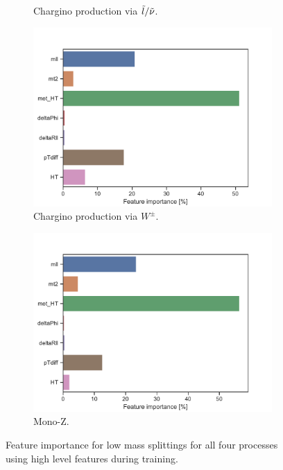 \begin{figure}[H]
\begin{subfigure}[t!]{0.49\textwidth}
        \caption{Chargino production via $\Tilde{l}/\Tilde{\nu}$.}
        \label{fig:}
    \end{subfigure}
    \begin{subfigure}[t!]{0.49\textwidth}
        \includegraphics[width = \textwidth]{Figures/WW/BDT/High_level/Low/featureImportance.pdf}
        \caption{Chargino production via $W^\pm$.}
        \label{fig:}
    \end{subfigure}
    \begin{subfigure}[t!]{0.49\textwidth}
        \includegraphics[width = \textwidth]{Figures/Mono_Z/ML/BDT/High_level/Low/featureImportance.pdf}
        \caption{Mono-Z.}
        \label{fig:}
    \end{subfigure}
    \caption{Feature importance for low mass splittings for all four processes using high level features during training.}
    \label{fig:Non}
\end{figure}


